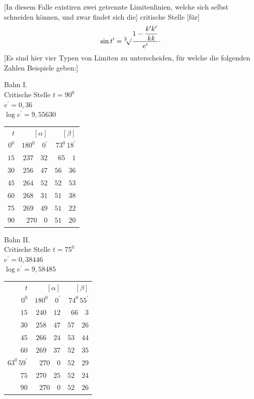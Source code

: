 [In diesem Falle existiren zwei getrennte Limitenlinien, welche sich selbst schneiden können, und zwar findet sich die] critische Stelle [für]
\[
\sin t^{\prime}=\BareRoot[3]{\frac{1-\dfrac{k^{\prime}k^{\prime}}{kk}}{e^{\prime}}}\mathpunct{\cdot}
\]
[Es sind hier vier Typen von Limiten zu unterscheiden, für welche die folgenden Zahlen Beispiele geben:]
\begin{center}
Bahn I.\\[3pt]
Critische Stelle \(t=90^{0}\)\\
\(e^{\prime}=0{,}36\)\\
\(\log e^{\prime}=9{,}55630\)\par\smallskip
\begin{tabular}{r@{\qquad}r@{\qquad}r}
\(t\)&\([\alpha]\)&\([\beta]\)\\[3pt]
\(0^{0}\)&\(180^{0}\quad0^{\prime}\)&\(73^{0}\,18^{\prime}\)\\
\(15\)&\(237\quad32\)&\(65\quad1\)\\
\(30\)&\(256\quad47\)&\(56\quad36\)\\
\(45\)&\(264\quad52\)&\(52\quad53\)\\
\(60\)&\(268\quad31\)&\(51\quad38\)\\
\(75\)&\(269\quad49\)&\(51\quad22\)\\
\(90\)&\(270\quad0\)&\(51\quad20\)
\end{tabular}
\end{center}
\begin{center}
Bahn II.\\[3pt]
Critische Stelle \(t=75^{0}\)\\
\(e^{\prime}=0{,}38446\)\\
\(\log e^{\prime}=9{,}58485\)\par\smallskip
\begin{tabular}{r@{\qquad}r@{\qquad}r}
\(t\)&\([\alpha]\)&\([\beta]\)\\[3pt]
\(0^{0}\)&\(180^{0}\quad0^{\prime}\)&\(74^{0}\,55^{\prime}\)\\
\(15\)&\(240\quad12\)&\(66\quad3\)\\
\(30\)&\(258\quad47\)&\(57\quad26\)\\
\(45\)&\(266\quad24\)&\(53\quad44\)\\
\(60\)&\(269\quad37\)&\(52\quad35\)\\
\(63^{0}\,59^{\prime}\)&\(270\quad0\)&\(52\quad29\)\\
\(75\)&\(270\quad25\)&\(52\quad24\)\\
\(90\)&\(270\quad0\)&\(52\quad26\)
\end{tabular}
\end{center}
